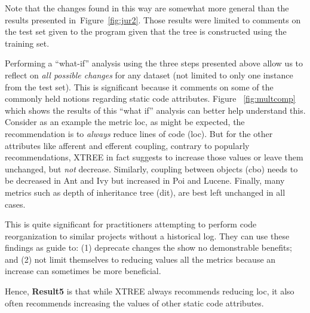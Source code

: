 \documentclass[twocolumn,5p]{elsarticle}
\newcommand{\fig}[1]{Figure~\ref{fig:#1}}
\theoremstyle{break}
\begin{document}
	
	{\color{steel}
	Note that the changes found in this way are somewhat more general than the 
	results presented in~\fig{jur2}. Those results were limited to comments on 
	the test set given to the program given that the tree is constructed using 
	the training set. 
	
	Performing a ``what-if'' analysis using the three steps presented above 
	allow us to reflect on {\em all possible changes} for any dataset (not 
	limited to only one instance from the test set). This is significant 
	because it comments on some of the commonly held notions regarding static 
	code attributes. Figure ~\ref{fig:multcomp} which shows the results of this 
	``what if'' analysis can better help understand this. Consider as an 
	example the metric loc, as might be expected, the recommendation is to
	\textit{always} reduce lines of code (loc). But for the other attributes 
	like afferent and efferent coupling, contrary to popularly recommendations,
	XTREE in fact suggests to increase those values or leave them unchanged, 
	but \textit{not} decrease. Similarly, coupling between objects (cbo) needs 
	to be decreased in Ant and Ivy but increased in Poi and Lucene. Finally, 
	many metrics such as depth of inheritance tree (dit), are best left 
	unchanged in all cases. 
	
	This is quite significant for practitioners 
	attempting to perform code reorganization to similar projects without a 
	historical log. They can use these findings as guide to: (1) deprecate 
	changes the show no demonstrable benefits; and (2) not limit themselves to 
	reducing values all the metrics because an increase can sometimes be more 
	beneficial.
	
	
	Hence, {\bf Result5} is that while XTREE always recommends reducing loc,
	it also   often recommends increasing the values of other static code 
	attributes.}
	
	
\end{document}
